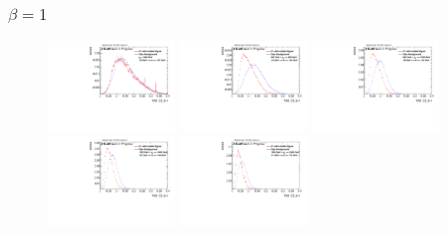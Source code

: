 \subsubsection*{$\beta=1$}
\begin{figure}[H]
\includegraphics[width=0.3\textwidth]{sascha_input/Appendix/Distributions/higgs/distributions/beta1/h_assisted_tj_C2_bin1.pdf} \hspace{1mm}
\includegraphics[width=0.3\textwidth]{sascha_input/Appendix/Distributions/higgs/distributions/beta1/h_assisted_tj_C2_bin2.pdf} \hspace{4mm}
\includegraphics[width=0.3\textwidth]{sascha_input/Appendix/Distributions/higgs/distributions/beta1/h_assisted_tj_C2_bin3.pdf} 
\bigskip
\includegraphics[width=0.3\textwidth]{sascha_input/Appendix/Distributions/higgs/distributions/beta1/h_assisted_tj_C2_bin4.pdf} \hspace{4mm}
\includegraphics[width=0.3\textwidth]{sascha_input/Appendix/Distributions/higgs/distributions/beta1/h_assisted_tj_C2_bin5.pdf} 


\end{figure}
